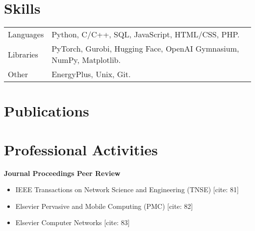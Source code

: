 \documentclass[a4paper,12pt]{article}
\begin{document}
\section{Skills}
\begin{tabularx}{\linewidth}{@{}l X@{}}
Languages & \normalsize{Python, C/C++, SQL, JavaScript, HTML/CSS, PHP.} \\ %
Libraries & \normalsize{PyTorch, Gurobi, Hugging Face, OpenAI Gymnasium, NumPy, Matplotlib.} \\ %
Other & \normalsize{EnergyPlus, Unix, Git.} \\ %
\end{tabularx}



\section{Publications}
\begin{refsection}
\nocite{*} %
\printbibliography[heading=none]
\end{refsection}


\section{Professional Activities}

\textbf{Journal Proceedings Peer Review}
\begin{itemize}[nosep,after=\strut, leftmargin=1em, itemsep=3pt,label=--]
\item IEEE Transactions on Network Science and Engineering (TNSE) [cite: 81]
\item Elsevier Pervasive and Mobile Computing (PMC) [cite: 82]
\item Elsevier Computer Networks [cite: 83]
\end{itemize}
\end{document}
